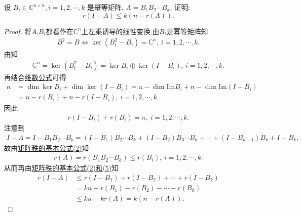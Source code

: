 \documentclass[../../main.tex]{subfiles}
\begin{document}
\begin{example}
设 $B_i \in \mathbb{C}^{n \times n}, i = 1, 2, \cdots, k$ 是幂等矩阵, $A = B_1 B_2 \cdots B_k$, 证明:
$$
r(I - A) \leqslant k(n - r(A)).
$$
\end{example}
\begin{proof}
将$A$,$B_i$都看作在$\mathbb{C}^n$上左乘诱导的线性变换.由$B_i$是幂等矩阵知
\begin{align*}
B^2 = B \Longleftrightarrow \ker (B_i^2 - B_i) = \mathbb{C}^n,\ i = 1,2,\cdots,k.
\end{align*}
由知
\begin{align*}
\mathbb{C}^n = \ker (B_i^2 - B_i) = \ker B_i \oplus \ker (I - B_i),\ i = 1,2,\cdots,k.
\end{align*}
再结合\hyperref[theorem:值域和核空间维数之和等于原像空间维数]{维数公式}可得
\begin{align*}
n &= \dim \ker B_i + \dim \ker (I - B_i) = n - \dim \mathrm{Im} B_i + n - \dim \mathrm{Im} (I - B_i) \\
&= n - r(B_i) + n - r(I - B_i),\ i = 1,2,\cdots,k.
\end{align*}
因此
\begin{align*}
r(I - B_i) + r(B_i) = n,\ i = 1,2,\cdots,k. 
\end{align*}
注意到
\begin{align*}
I - A = I - B_1B_2\cdots B_k = (I - B_1)B_2\cdots B_k + (I - B_2)B_3\cdots B_k + \cdots + (I - B_{k-1})B_k + I - B_k,
\end{align*}
故由\hyperref[proposition:矩阵秩的基本公式]{矩阵秩的基本公式(2)}知
\begin{align*}
r(A) = r(B_1B_2\cdots B_k) \leqslant r(B_i),\ i = 1,2,\cdots,k.
\end{align*}
从而再由\hyperref[proposition:矩阵秩的基本公式]{矩阵秩的基本公式(2)和(5)}知
\begin{align*}
r(I - A) &\leqslant r(I - B_1) + r(I - B_2) + \cdots + r(I - B_k) \\
&= kn - r(B_1) - r(B_2) - \cdots - r(B_k) \\
&\leqslant kn - kr(A) = k(n - r(A)).
\end{align*}

\end{proof}
\end{document}
